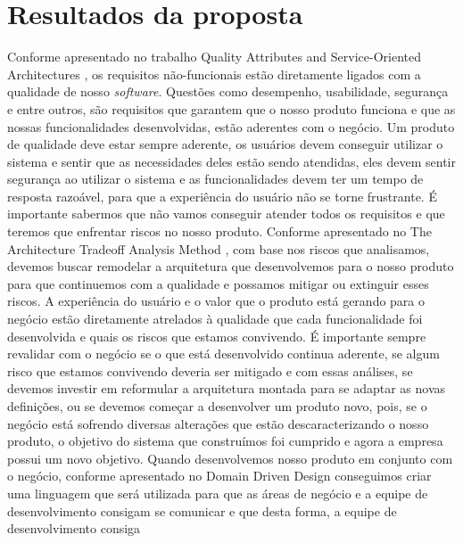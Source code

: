   \section{Resultados da proposta}
    Conforme apresentado no trabalho Quality Attributes and Service-Oriented Architectures
    \cite{O'BrienQualityAttributes2005}, os requisitos não-funcionais estão diretamente
    ligados com a qualidade de nosso \textit{software}. Questões como desempenho,
    usabilidade, segurança e entre outros, são requisitos que garantem que o nosso
    produto funciona e que as nossas funcionalidades desenvolvidas, estão aderentes
    com o negócio. \newline
    Um produto de qualidade deve estar sempre aderente, os usuários devem conseguir
    utilizar o sistema e sentir que as necessidades deles estão sendo atendidas,
    eles devem sentir segurança ao utilizar o sistema e as funcionalidades devem
    ter um tempo de resposta razoável, para que a experiência do usuário não se
    torne frustrante. É importante sabermos que não vamos conseguir atender todos
    os requisitos e que teremos que enfrentar riscos no nosso produto. Conforme
    apresentado no The Architecture Tradeoff Analysis Method \cite{KazmanTheArchitecture1998},
    com base nos riscos que analisamos, devemos buscar remodelar a arquitetura que
    desenvolvemos para o nosso produto para que continuemos com a qualidade e possamos
    mitigar ou extinguir esses riscos. A experiência do usuário e o valor que o
    produto está gerando para o negócio estão diretamente atrelados à qualidade
    que cada funcionalidade foi desenvolvida e quais os riscos que estamos convivendo.
    É importante sempre revalidar com o negócio se o que está desenvolvido continua
    aderente, se algum risco que estamos convivendo deveria ser mitigado e com essas
    análises, se devemos investir em reformular a arquitetura montada para se
    adaptar as novas definições, ou se devemos começar a desenvolver um produto
    novo, pois, se o negócio está sofrendo diversas alterações que estão descaracterizando
    o nosso produto, o objetivo do sistema que construímos foi cumprido e agora
    a empresa possui um novo objetivo. \newline
    Quando desenvolvemos nosso produto em conjunto com o negócio, conforme apresentado
    no Domain Driven Design \cite{DomainDrivenDesign} conseguimos criar uma linguagem
    que será utilizada para que as áreas de negócio e a equipe de desenvolvimento
    consigam se comunicar e que desta forma, a equipe de desenvolvimento consiga
